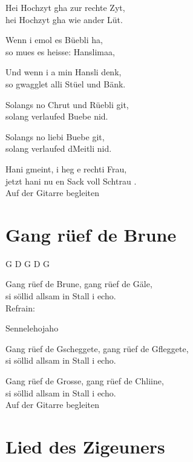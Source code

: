 \documentclass[
  letterpaper,
  twoside=false]{scrbook}
\begin{document}
Hei Hochzyt gha zur rechte Zyt,\\
hei Hochzyt gha wie ander Lüt.

Wenn i emol es Büebli ha,\\
so mues es heisse: Hanslimaa,

Und wenn i a min Hansli denk,\\
so gwagglet alli Stüel und Bänk.

Solangs no Chrut und Rüebli git,\\
solang verlaufed Buebe nid.

Solangs no liebi Buebe git,\\
solang verlaufed d\textquotesingle Meitli nid.

Hani gmeint, i heg e rechti Frau,\\
jetzt hani nu en Sack voll Schtrau .\\
Auf der Gitarre begleiten

\hypertarget{gang-ruxfcef-de-brune}{%
\chapter{Gang rüef de Brune}\label{gang-ruxfcef-de-brune}}

G D G D G

Gang rüef de Brune, gang rüef de Gäle,\\
si söllid allsam in Stall i echo.\\
Refrain:

Sennelehojaho

Gang rüef de Gscheggete, gang rüef de Gfleggete,\\
si söllid allsam in Stall i echo.

Gang rüef de Grosse, gang rüef de Chliine,\\
si söllid allsam in Stall i echo.\\
Auf der Gitarre begleiten

\hypertarget{lied-des-zigeuners}{%
\chapter{Lied des Zigeuners}\label{lied-des-zigeuners}}
\end{document}
